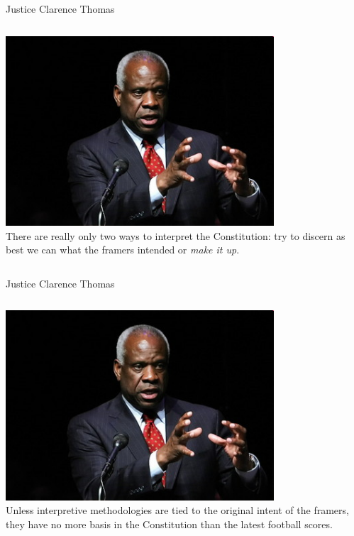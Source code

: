 \begin{frame}{Justice Clarence Thomas}
    \begin{columns}[onlytextwidth]
            \centering
            \includegraphics[width=0.75\textwidth]{img/clarence-thomas.png} \\
            There are really only two ways to interpret the Constitution: try to discern as best we can what the framers intended or \emph{make it up}.
    \end{columns}
\end{frame}

\begin{frame}{Justice Clarence Thomas}
    \begin{columns}[onlytextwidth]
            \centering
            \includegraphics[width=0.75\textwidth]{img/clarence-thomas.png} \\
        Unless interpretive methodologies are tied to the original intent of the framers, they have no more basis in the Constitution than the latest football scores.
    \end{columns}
\end{frame}

